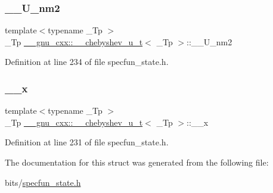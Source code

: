\subsubsection{\texorpdfstring{\+\_\+\+\_\+\+U\+\_\+nm2}{\_\_U\_nm2}}
{\footnotesize\ttfamily template$<$typename \+\_\+\+Tp $>$ \\
\+\_\+\+Tp \hyperlink{struct____gnu__cxx_1_1____chebyshev__u__t}{\+\_\+\+\_\+gnu\+\_\+cxx\+::\+\_\+\+\_\+chebyshev\+\_\+u\+\_\+t}$<$ \+\_\+\+Tp $>$\+::\+\_\+\+\_\+\+U\+\_\+nm2}



Definition at line 234 of file specfun\+\_\+state.\+h.

\mbox{\label{struct____gnu__cxx_1_1____chebyshev__u__t_a038c998d409d5fb0404df67afb9b217c}} 
\subsubsection{\texorpdfstring{\+\_\+\+\_\+x}{\_\_x}}
{\footnotesize\ttfamily template$<$typename \+\_\+\+Tp $>$ \\
\+\_\+\+Tp \hyperlink{struct____gnu__cxx_1_1____chebyshev__u__t}{\+\_\+\+\_\+gnu\+\_\+cxx\+::\+\_\+\+\_\+chebyshev\+\_\+u\+\_\+t}$<$ \+\_\+\+Tp $>$\+::\+\_\+\+\_\+x}



Definition at line 231 of file specfun\+\_\+state.\+h.



The documentation for this struct was generated from the following file\+:\begin{DoxyCompactItemize}
\item 
bits/\hyperlink{specfun__state_8h}{specfun\+\_\+state.\+h}\end{DoxyCompactItemize}
